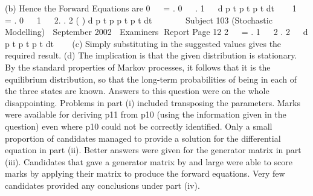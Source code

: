 (b) Hence the Forward Equations are
0   = . 0   . 1   d p t p t p t
dt  
1   = . 0   1   2. . 2 ( ) d p t p p t p t
dt     
Subject 103 (Stochastic Modelling)  September 2002  Examiners Report
Page 12
2   = . 1   2 . 2   d p t p t p t
dt   
(c) Simply substituting in the suggested values gives the required result.
(d) The implication is that the given distribution is stationary. By the
standard properties of Markov processes, it follows that it is the
equilibrium distribution, so that the long-term probabilities of being in
each of the three states are known.
Answers to this question were on the whole disappointing.
Problems in part (i) included transposing the parameters. Marks were available for deriving
p11 from p10 (using the information given in the question) even where p10 could not be
correctly identified.
Only a small proportion of candidates managed to provide a solution for the differential
equation in part (ii).
Better answers were given for the generator matrix in part (iii).
Candidates that gave a generator matrix by and large were able to score marks by applying
their matrix to produce the forward equations. Very few candidates provided any
conclusions under part (iv).
